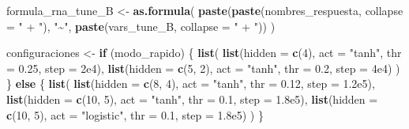 \documentclass[
]{article}
\newenvironment{Shaded}{\begin{snugshade}}{\end{snugshade}}
\newcommand{\AttributeTok}[1]{\textcolor[rgb]{0.13,0.29,0.53}{#1}}
\newcommand{\ControlFlowTok}[1]{\textcolor[rgb]{0.13,0.29,0.53}{\textbf{#1}}}
\newcommand{\DecValTok}[1]{\textcolor[rgb]{0.00,0.00,0.81}{#1}}
\newcommand{\FloatTok}[1]{\textcolor[rgb]{0.00,0.00,0.81}{#1}}
\newcommand{\FunctionTok}[1]{\textcolor[rgb]{0.13,0.29,0.53}{\textbf{#1}}}
\newcommand{\NormalTok}[1]{#1}
\newcommand{\OtherTok}[1]{\textcolor[rgb]{0.56,0.35,0.01}{#1}}
\newcommand{\StringTok}[1]{\textcolor[rgb]{0.31,0.60,0.02}{#1}}
\begin{document}
\begin{Shaded}
\begin{Highlighting}[]
\NormalTok{  formula\_rna\_tune\_B }\OtherTok{\textless{}{-}} \FunctionTok{as.formula}\NormalTok{(}
    \FunctionTok{paste}\NormalTok{(}\FunctionTok{paste}\NormalTok{(nombres\_respuesta, }\AttributeTok{collapse =} \StringTok{" + "}\NormalTok{), }\StringTok{"\textasciitilde{}"}\NormalTok{, }\FunctionTok{paste}\NormalTok{(vars\_tune\_B, }\AttributeTok{collapse =} \StringTok{" + "}\NormalTok{))}
\NormalTok{  )}

\NormalTok{  configuraciones }\OtherTok{\textless{}{-}} \ControlFlowTok{if}\NormalTok{ (modo\_rapido) \{}
    \FunctionTok{list}\NormalTok{(}
      \FunctionTok{list}\NormalTok{(}\AttributeTok{hidden =} \FunctionTok{c}\NormalTok{(}\DecValTok{4}\NormalTok{), }\AttributeTok{act =} \StringTok{"tanh"}\NormalTok{, }\AttributeTok{thr =} \FloatTok{0.25}\NormalTok{, }\AttributeTok{step =} \FloatTok{2e4}\NormalTok{),}
      \FunctionTok{list}\NormalTok{(}\AttributeTok{hidden =} \FunctionTok{c}\NormalTok{(}\DecValTok{5}\NormalTok{, }\DecValTok{2}\NormalTok{), }\AttributeTok{act =} \StringTok{"tanh"}\NormalTok{, }\AttributeTok{thr =} \FloatTok{0.2}\NormalTok{, }\AttributeTok{step =} \FloatTok{4e4}\NormalTok{)}
\NormalTok{    )}
\NormalTok{  \} }\ControlFlowTok{else}\NormalTok{ \{}
    \FunctionTok{list}\NormalTok{(}
      \FunctionTok{list}\NormalTok{(}\AttributeTok{hidden =} \FunctionTok{c}\NormalTok{(}\DecValTok{8}\NormalTok{, }\DecValTok{4}\NormalTok{), }\AttributeTok{act =} \StringTok{"tanh"}\NormalTok{, }\AttributeTok{thr =} \FloatTok{0.12}\NormalTok{, }\AttributeTok{step =} \FloatTok{1.2e5}\NormalTok{),}
      \FunctionTok{list}\NormalTok{(}\AttributeTok{hidden =} \FunctionTok{c}\NormalTok{(}\DecValTok{10}\NormalTok{, }\DecValTok{5}\NormalTok{), }\AttributeTok{act =} \StringTok{"tanh"}\NormalTok{, }\AttributeTok{thr =} \FloatTok{0.1}\NormalTok{, }\AttributeTok{step =} \FloatTok{1.8e5}\NormalTok{),}
      \FunctionTok{list}\NormalTok{(}\AttributeTok{hidden =} \FunctionTok{c}\NormalTok{(}\DecValTok{10}\NormalTok{, }\DecValTok{5}\NormalTok{), }\AttributeTok{act =} \StringTok{"logistic"}\NormalTok{, }\AttributeTok{thr =} \FloatTok{0.1}\NormalTok{, }\AttributeTok{step =} \FloatTok{1.8e5}\NormalTok{)}
\NormalTok{    )}
\NormalTok{  \}}


\end{Highlighting}
\end{Shaded}
\end{document}
